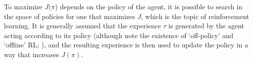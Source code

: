To maximize $J(\pi$) depends on the policy of the agent, it is possible to search in the space of policies for one that maximizes $J$, which is the topic of reinforcement learning.
It is generally assumed that the experience $\tau$ is generated by the agent acting according to its policy (although note the existence of `off-policy' and `offline' RL; \citealp{levine2020offline}), and the resulting experience is then used to update the policy in a way that increases $J(\pi)$.




